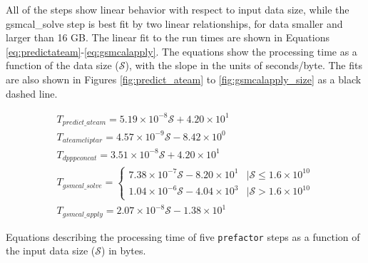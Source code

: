 \documentclass[preprint,5p]{elsarticle}
\providecommand{\DIFadd}[1]{{\protect\color{blue}\uwave{#1}}} %
\providecommand{\DIFaddbegin}{} %
\providecommand{\DIFaddend}{} %
\providecommand{\DIFdelbegin}{} %
\providecommand{\DIFdelend}{} %
\newcommand{\DIFscaledelfig}{0.5}
\newlength{\DIFdelgraphicswidth} %
\newlength{\DIFdelgraphicsheight} %
\newcommand{\DIFaddincludegraphics}[2][]{{\color{blue}\fbox{\DIFOincludegraphics[#1]{#2}}}} %
\newcommand{\DIFdelincludegraphics}[2][]{%
\sbox{\DIFdelgraphicsbox}{\DIFOincludegraphics[#1]{#2}}%
\settoboxwidth{\DIFdelgraphicswidth}{\DIFdelgraphicsbox} %
\settoboxtotalheight{\DIFdelgraphicsheight}{\DIFdelgraphicsbox} %
\scalebox{\DIFscaledelfig}{%
\parbox[b]{\DIFdelgraphicswidth}{\usebox{\DIFdelgraphicsbox}\\[-\baselineskip] \rule{\DIFdelgraphicswidth}{0em}}\llap{\resizebox{\DIFdelgraphicswidth}{\DIFdelgraphicsheight}{%
\setlength{\unitlength}{\DIFdelgraphicswidth}%
\begin{picture}(1,1)%
\thicklines\linethickness{2pt} %
{\color[rgb]{1,0,0}\put(0,0){\framebox(1,1){}}}%
{\color[rgb]{1,0,0}\put(0,0){\line( 1,1){1}}}%
{\color[rgb]{1,0,0}\put(0,1){\line(1,-1){1}}}%
\end{picture}%
}\hspace*{3pt}}} %
} %
\DeclareRobustCommand{\DIFaddbegin}{\DIFOaddbegin \let\includegraphics\DIFaddincludegraphics} %
\DeclareRobustCommand{\DIFaddend}{\DIFOaddend \let\includegraphics\DIFOincludegraphics} %
\DeclareRobustCommand{\DIFdelbegin}{\DIFOdelbegin \let\includegraphics\DIFdelincludegraphics} %
\DeclareRobustCommand{\DIFdelend}{\DIFOaddend \let\includegraphics\DIFOincludegraphics} %
\begin{document}
All of the steps show \DIFaddbegin \DIFadd{a }\DIFaddend linear behavior with respect to input data size, while the \DIFaddbegin {\selectfont \DIFaddend gsmcal\_solve step\DIFaddbegin } \DIFaddend is best fit by two linear relationships, for data smaller and larger than 16 GB. The linear fit to the run times are shown in Equations \ref{eq:predictateam}-\ref{eq:gsmcalapply}. The equations show the processing time as a function of the data size ($\mathcal{S}$), with the slope in the units of seconds/byte. The fits are also shown in Figures \ref{fig:predict_ateam} to \ref{fig:gsmcalapply_size} as a black dashed line.

\begin{equ*}
\begin{subequations}
\begin{align}
        T_{predict\_ateam}=5.19\times10^{-8}\mathcal{S}+4.20\times10^1 \label{eq:predictateam} \\
        T_{ateamcliptar}=4.57\times10^{-9}\mathcal{S}-8.42\times10^0 \label{eq:ateamcliptar} \\
        T_{dpppconcat}=3.51\times10^{-8}\mathcal{S}+4.20\times10^1 \label{eq:dpppconcat} \\
        T_{gsmcal\_solve}=\DIFdelbegin %
\DIFdelend \DIFaddbegin \begin{cases}
                          7.38\times10^{-7}\mathcal{S}-8.20\times10^1 &|\mathcal{S}\leq1.6\times10^{10}\\
                          1.04\times10^{-6}\mathcal{S}-4.04\times10^3 & |\mathcal{S}>1.6\times10^{10}
    \end{cases} \DIFaddend \label{eq:gsmcalsolve} \\
        T_{gsmcal\_apply}=2.07\times10^{-8}\mathcal{S}-1.38\times10^1 \label{eq:gsmcalapply}    
\end{align}
\label{eq:runtime_size_models}
\end{subequations}
\caption{Equations describing the processing time of five \texttt{prefactor} steps as a function of the input data size ($\mathcal{S}$) in bytes.}
\end{equ*}
\end{document}
